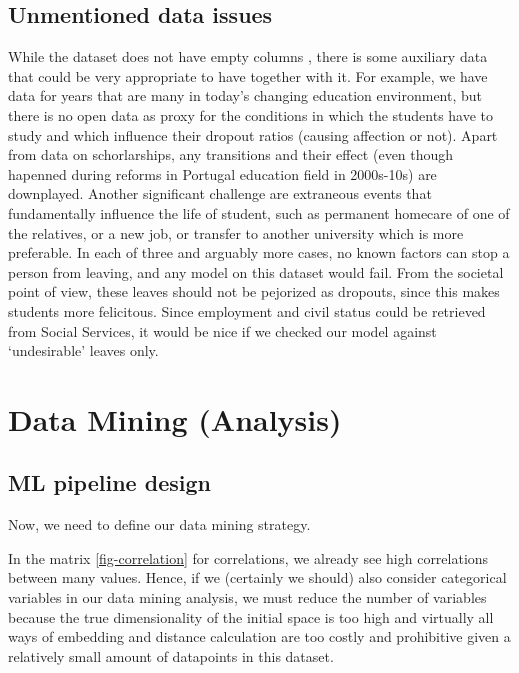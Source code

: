 \documentclass[
  letterpaper,
  DIV=11,
  numbers=noendperiod]{scrartcl}
\begin{document}
\hypertarget{unmentioned-data-issues}{%
\subsection{Unmentioned data issues}\label{unmentioned-data-issues}}

While the dataset does not have empty columns , there is some auxiliary
data that could be very appropriate to have together with it. For
example, we have data for years that are many in today's changing
education environment, but there is no open data as proxy for the
conditions in which the students have to study and which influence their
dropout ratios (causing affection or not). Apart from data on
schorlarships, any transitions and their effect (even though hapenned
during reforms in Portugal education field in 2000s-10s) are downplayed.
Another significant challenge are extraneous events that fundamentally
influence the life of student, such as permanent homecare of one of the
relatives, or a new job, or transfer to another university which is more
preferable. In each of three and arguably more cases, no known factors
can stop a person from leaving, and any model on this dataset would
fail. From the societal point of view, these leaves should not be
pejorized as dropouts, since this makes students more felicitous. Since
employment and civil status could be retrieved from Social Services, it
would be nice if we checked our model against \enquote*{undesirable}
leaves only.

\hypertarget{sec-data-mining}{%
\section{Data Mining (Analysis)}\label{sec-data-mining}}

\hypertarget{ml-pipeline-design}{%
\subsection{ML pipeline design}\label{ml-pipeline-design}}

Now, we need to define our data mining strategy.

In the matrix \ref{fig-correlation} for correlations, we already see
high correlations between many values. Hence, if we (certainly we
should) also consider categorical variables in our data mining analysis,
we must reduce the number of variables because the true dimensionality
of the initial space is too high and virtually all ways of embedding and
distance calculation are too costly and prohibitive given a relatively
small amount of datapoints in this dataset.
\end{document}

